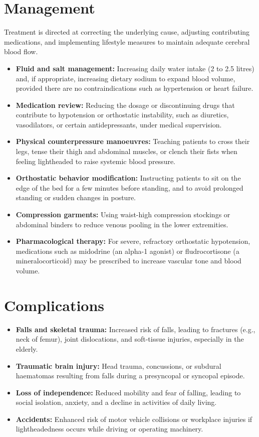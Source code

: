 \section*{Management}
Treatment is directed at correcting the underlying cause, adjusting contributing medications, and implementing lifestyle measures to maintain adequate cerebral blood flow.
\begin{itemize}
    \item \textbf{Fluid and salt management:} Increasing daily water intake (2 to 2.5 litres) and, if appropriate, increasing dietary sodium to expand blood volume, provided there are no contraindications such as hypertension or heart failure.
    \item \textbf{Medication review:} Reducing the dosage or discontinuing drugs that contribute to hypotension or orthostatic instability, such as diuretics, vasodilators, or certain antidepressants, under medical supervision.
    \item \textbf{Physical counterpressure manoeuvres:} Teaching patients to cross their legs, tense their thigh and abdominal muscles, or clench their fists when feeling lightheaded to raise systemic blood pressure.
    \item \textbf{Orthostatic behavior modification:} Instructing patients to sit on the edge of the bed for a few minutes before standing, and to avoid prolonged standing or sudden changes in posture.
    \item \textbf{Compression garments:} Using waist-high compression stockings or abdominal binders to reduce venous pooling in the lower extremities.
    \item \textbf{Pharmacological therapy:} For severe, refractory orthostatic hypotension, medications such as midodrine (an alpha-1 agonist) or fludrocortisone (a mineralocorticoid) may be prescribed to increase vascular tone and blood volume.
\end{itemize}

\section*{Complications}
\begin{itemize}
    \item \textbf{Falls and skeletal trauma:} Increased risk of falls, leading to fractures (e.g., neck of femur), joint dislocations, and soft-tissue injuries, especially in the elderly.
    \item \textbf{Traumatic brain injury:} Head trauma, concussions, or subdural haematomas resulting from falls during a presyncopal or syncopal episode.
    \item \textbf{Loss of independence:} Reduced mobility and fear of falling, leading to social isolation, anxiety, and a decline in activities of daily living.
    \item \textbf{Accidents:} Enhanced risk of motor vehicle collisions or workplace injuries if lightheadedness occurs while driving or operating machinery.
\end{itemize}

